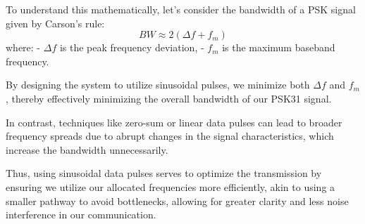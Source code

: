 To understand this mathematically, let’s consider the bandwidth of a PSK signal given by Carson’s rule:
\[
BW \approx 2(\Delta f + f_m)
\]
where:
- \(\Delta f\) is the peak frequency deviation,
- \(f_m\) is the maximum baseband frequency.

By designing the system to utilize sinusoidal pulses, we minimize both \(\Delta f\) and \(f_m\), thereby effectively minimizing the overall bandwidth of our PSK31 signal.

In contrast, techniques like zero-sum or linear data pulses can lead to broader frequency spreads due to abrupt changes in the signal characteristics, which increase the bandwidth unnecessarily. 

Thus, using sinusoidal data pulses serves to optimize the transmission by ensuring we utilize our allocated frequencies more efficiently, akin to using a smaller pathway to avoid bottlenecks, allowing for greater clarity and less noise interference in our communication.

